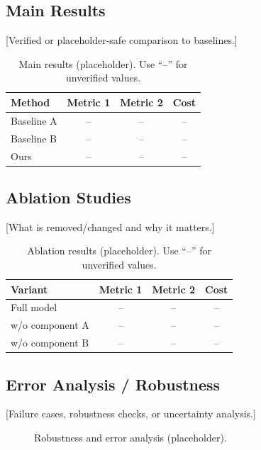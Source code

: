 \documentclass[conference]{IEEEtran}
\begin{document}
\subsection{Main Results}
[Verified or placeholder-safe comparison to baselines.]

\begin{table}[t]
\centering
\caption{Main results (placeholder). Use ``--'' for unverified values.}
\label{tab:main_results}
\begin{tabular}{lccc}
\toprule
Method & Metric 1 & Metric 2 & Cost \\
\midrule
Baseline A & -- & -- & -- \\
Baseline B & -- & -- & -- \\
Ours & -- & -- & -- \\
\bottomrule
\end{tabular}
\end{table}

\subsection{Ablation Studies}
[What is removed/changed and why it matters.]

\begin{table}[t]
\centering
\caption{Ablation results (placeholder). Use ``--'' for unverified values.}
\label{tab:ablation_results}
\begin{tabular}{lccc}
\toprule
Variant & Metric 1 & Metric 2 & Cost \\
\midrule
Full model & -- & -- & -- \\
w/o component A & -- & -- & -- \\
w/o component B & -- & -- & -- \\
\bottomrule
\end{tabular}
\end{table}

\subsection{Error Analysis / Robustness}
[Failure cases, robustness checks, or uncertainty analysis.]

\begin{figure}[t]
\centering
{}
\caption{Robustness and error analysis (placeholder).}
\label{fig:robustness}
\end{figure}
\end{document}
